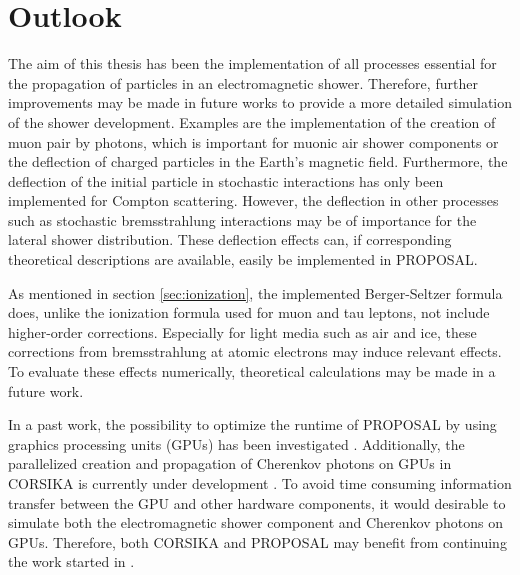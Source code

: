 \section{Outlook}

The aim of this thesis has been the implementation of all processes essential for the propagation of particles in an electromagnetic shower.
Therefore, further improvements may be made in future works to provide a more detailed simulation of the shower development.
Examples are the implementation of the creation of muon pair by photons, which is important for muonic air shower components \cite{corsika_physics} or the deflection of charged particles in the Earth's magnetic field.
Furthermore, the deflection of the initial particle in stochastic interactions has only been implemented for Compton scattering.
However, the deflection in other processes such as stochastic bremsstrahlung interactions may be of importance for the lateral shower distribution.
These deflection effects can, if corresponding theoretical descriptions are available, easily be implemented in PROPOSAL.

As mentioned in section \ref{sec:ionization}, the implemented Berger-Seltzer formula does, unlike the ionization formula used for muon and tau leptons, not include higher-order corrections.
Especially for light media such as air and ice, these corrections from bremsstrahlung at atomic electrons may induce relevant effects.
To evaluate these effects numerically, theoretical calculations may be made in a future work. 

In a past work, the possibility to optimize the runtime of PROPOSAL by using graphics processing units (GPUs) has been investigated \cite{tomasz}.
Additionally, the parallelized creation and propagation of Cherenkov photons on GPUs in CORSIKA is currently under development \cite{baack}.
To avoid time consuming information transfer between the GPU and other hardware components, it would desirable to simulate both the electromagnetic shower component and Cherenkov photons on GPUs.
Therefore, both CORSIKA and PROPOSAL may benefit from continuing the work started in \cite{tomasz}.

